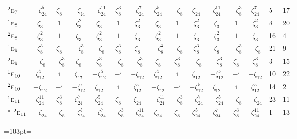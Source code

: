 \documentclass[10pt,a4paper]{article}
\newcommand{\needspace}[1]{\par\penalty-100\begingroup\dimen0=#1\relax\dimen2=\pagegoal
  \advance\dimen2-\pagetotal\ifdim\dimen0>\dimen2\relax\ifdim\dimen2>0pt\vfil\break\fi\fi
  \endgroup}
\numberwithin{equation}{section}
\newcommand{\irr}[1]{\text{\normalfont\scshape #1}}
\newcommand{\conjpair}[1]{{}^{#1}}
\newcommand{\iunit}{\mathrm{i}}
\newcommand{\rootunity}[1]{\zeta_{#1}}
\begin{document}
{\begin{longtable}{@{}lccccccccccccll@{}}
$\conjpair{2}\irr{e}_{7}$ & $-\rootunity{24}^{5}$ & $\rootunity{8}$ & $-\rootunity{24}$ & $-\rootunity{24}^{11}$ & $\rootunity{8}^{3}$ & $-\rootunity{24}^{7}$ & $\rootunity{24}^{5}$ & $-\rootunity{8}$ & $\rootunity{24}$ & $\rootunity{24}^{11}$ & $-\rootunity{8}^{3}$ & $\rootunity{24}^{7}$ & 5 & 17\\
$\conjpair{1}\irr{e}_{8}$ & $\rootunity{3}$ & $1$ & $\rootunity{3}^{2}$ & $\rootunity{3}$ & $1$ & $\rootunity{3}^{2}$ & $\rootunity{3}$ & $1$ & $\rootunity{3}^{2}$ & $\rootunity{3}$ & $1$ & $\rootunity{3}^{2}$ & 8 & 20\\
$\conjpair{2}\irr{e}_{8}$ & $\rootunity{3}^{2}$ & $1$ & $\rootunity{3}$ & $\rootunity{3}^{2}$ & $1$ & $\rootunity{3}$ & $\rootunity{3}^{2}$ & $1$ & $\rootunity{3}$ & $\rootunity{3}^{2}$ & $1$ & $\rootunity{3}$ & 16 & 4\\
$\conjpair{1}\irr{e}_{9}$ & $\rootunity{8}^{3}$ & $\rootunity{8}$ & $-\rootunity{8}^{3}$ & $-\rootunity{8}$ & $\rootunity{8}^{3}$ & $\rootunity{8}$ & $-\rootunity{8}^{3}$ & $-\rootunity{8}$ & $\rootunity{8}^{3}$ & $\rootunity{8}$ & $-\rootunity{8}^{3}$ & $-\rootunity{8}$ & 21 & 9\\
$\conjpair{2}\irr{e}_{9}$ & $-\rootunity{8}$ & $-\rootunity{8}^{3}$ & $\rootunity{8}$ & $\rootunity{8}^{3}$ & $-\rootunity{8}$ & $-\rootunity{8}^{3}$ & $\rootunity{8}$ & $\rootunity{8}^{3}$ & $-\rootunity{8}$ & $-\rootunity{8}^{3}$ & $\rootunity{8}$ & $\rootunity{8}^{3}$ & 3 & 15\\
$\conjpair{1}\irr{e}_{10}$ & $\rootunity{12}^{5}$ & $\iunit{}$ & $\rootunity{12}$ & $-\rootunity{12}^{5}$ & $-\iunit{}$ & $-\rootunity{12}$ & $\rootunity{12}^{5}$ & $\iunit{}$ & $\rootunity{12}$ & $-\rootunity{12}^{5}$ & $-\iunit{}$ & $-\rootunity{12}$ & 10 & 22\\
$\conjpair{2}\irr{e}_{10}$ & $-\rootunity{12}$ & $-\iunit{}$ & $-\rootunity{12}^{5}$ & $\rootunity{12}$ & $\iunit{}$ & $\rootunity{12}^{5}$ & $-\rootunity{12}$ & $-\iunit{}$ & $-\rootunity{12}^{5}$ & $\rootunity{12}$ & $\iunit{}$ & $\rootunity{12}^{5}$ & 14 & 2\\
$\conjpair{1}\irr{e}_{11}$ & $\rootunity{24}^{11}$ & $\rootunity{8}^{3}$ & $\rootunity{24}^{7}$ & $\rootunity{24}^{5}$ & $\rootunity{8}$ & $\rootunity{24}$ & $-\rootunity{24}^{11}$ & $-\rootunity{8}^{3}$ & $-\rootunity{24}^{7}$ & $-\rootunity{24}^{5}$ & $-\rootunity{8}$ & $-\rootunity{24}$ & 23 & 11\\*
$\conjpair{2}\irr{e}_{11}$ & $-\rootunity{24}$ & $-\rootunity{8}$ & $-\rootunity{24}^{5}$ & $-\rootunity{24}^{7}$ & $-\rootunity{8}^{3}$ & $-\rootunity{24}^{11}$ & $\rootunity{24}$ & $\rootunity{8}$ & $\rootunity{24}^{5}$ & $\rootunity{24}^{7}$ & $\rootunity{8}^{3}$ & $\rootunity{24}^{11}$ & 1 & 13\\
\bottomrule\end{longtable}}
\needspace{103pt}
\end{document}
